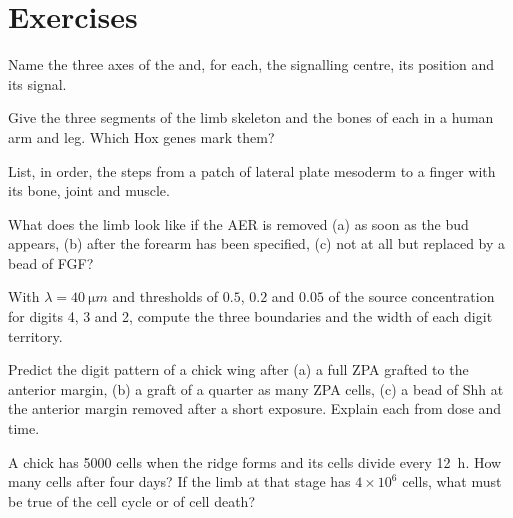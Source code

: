 \section{Exercises}

\begin{exercise}[$\star$]\label{exo:b2:limb-organogenesis:1}
Name the three axes of the  and, for each, the signalling
centre, its position and its signal.
\end{exercise}

\begin{exercise}[$\star$]\label{exo:b2:limb-organogenesis:2}
Give the three segments of the limb skeleton and the bones of each
in a human arm and leg. Which Hox genes mark them?
\end{exercise}

\begin{exercise}[$\star$]\label{exo:b2:limb-organogenesis:3}
List, in order, the steps from a patch of lateral plate mesoderm
to a finger with its bone, joint and muscle.
\end{exercise}

\begin{exercise}[$\star$]\label{exo:b2:limb-organogenesis:4}
What does the limb look like if the AER is removed (a) as soon as
the bud appears, (b) after the forearm has been specified, (c) not
at all but replaced by a bead of FGF?
\end{exercise}

\begin{exercise}[$\star\star$]\label{exo:b2:limb-organogenesis:5}
With $\lambda = \qty{40}{\micro m}$ and thresholds of $0.5$, $0.2$
and $0.05$ of the source concentration for digits 4, 3 and 2, compute
the three boundaries and the width of each digit territory.
\end{exercise}

\begin{exercise}[$\star\star$]\label{exo:b2:limb-organogenesis:6}
Predict the digit pattern of a chick wing after (a) a full ZPA
grafted to the anterior margin, (b) a graft of a quarter as many
ZPA cells, (c) a bead of Shh at the anterior margin removed after a
short exposure. Explain each from dose and time.
\end{exercise}

\begin{exercise}[$\star\star$]\label{exo:b2:limb-organogenesis:7}
A chick  has \num{5000} cells when the ridge forms and its
cells divide every \qty{12}{h}. How many cells after four days? If
the limb at that stage has $4\times 10^{6}$ cells, what must be
true of the cell cycle or of cell death?
\end{exercise}


